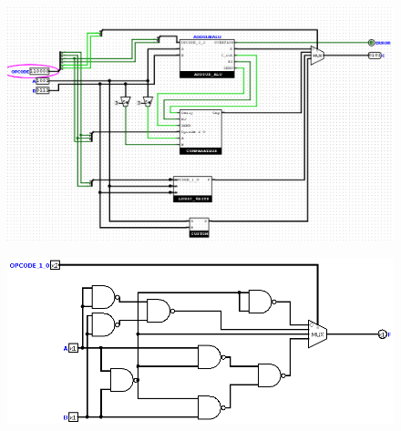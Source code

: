\documentclass[a4paper]{article}
\begin{document}
\begin{figure}[H]
    \centering
    \includegraphics[width=\textwidth]{src/ALU_TEST_CUSTOM.png}
    \label{fig:TEST_ALU_CUSTO}
\end{figure}


\begin{figure}[H]
    \centering
    \includegraphics[width=\textwidth]{src/LOGIC_1BIT.png}
    \label{fig:LOGIQUE_1BIT}
\end{figure}
\end{document}
